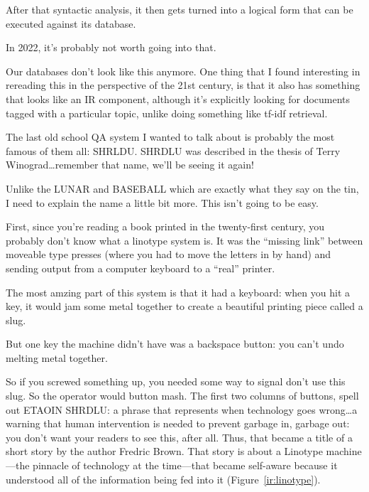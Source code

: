 
After that syntactic analysis, it then gets
turned into a logical form that can be executed
%
against its database.

In 2022, it’s probably not worth going into
that.

Our databases don’t look like this anymore.
%
One thing that I found interesting in rereading
this in the perspective of the 21st century,
%
is that it also has something that looks like
an IR component, although it’s explicitly
%
looking for documents tagged with a particular
topic, unlike doing something like tf-idf
%
retrieval.

The last old school QA system I wanted to
talk about is probably the most famous of
%
them all: SHRLDU.
%
SHRDLU was described in the thesis of Terry
Winograd\dots remember that name, we’ll be
%
seeing it again!

Unlike the LUNAR and BASEBALL which are exactly
what they say on the tin, I need to explain
%
the name a little bit more.
%
This isn’t going to be easy.

First, since you’re reading a book printed in the twenty-first century,
you probably don’t know what a linotype
system is.
%
It was the “missing link” between moveable
type presses (where you had to move the letters
in by hand) and sending output from a computer
keyboard to a “real” printer.

The most amzing part of this system is that
it had a keyboard: when you hit a key, it
would jam some metal together to create a
beautiful printing piece called a slug.

But one key the machine didn’t have was
a backspace button: you can’t undo melting
metal together.

So if you screwed something up, you needed
some way to signal don’t use this slug.
%
So the operator would button mash.
%
The first two columns of buttons, spell out
ETAOIN SHRDLU: a phrase that represents when
%
technology goes wrong\dots a warning that human
intervention is needed to prevent garbage
%
in, garbage out: you don’t want your readers
to see this, after all.
%
Thus, that became a title of a short story
by the author Fredric Brown.
%
That story is about a Linotype machine—the
pinnacle of technology at the time—that
became self-aware because it understood all
of the information being fed into it (Figure~\ref{ir:linotype}).

